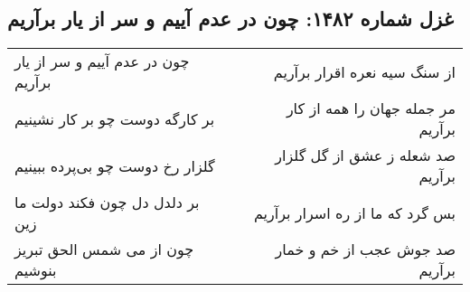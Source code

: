 \begin{center}
\section*{غزل شماره ۱۴۸۲: چون در عدم آییم و سر از یار برآریم}
\label{sec:1482}
\begin{longtable}{l p{0.5cm} r}
چون در عدم آییم و سر از یار برآریم
&&
از سنگ سیه نعره اقرار برآریم
\\
بر کارگه دوست چو بر کار نشینیم
&&
مر جمله جهان را همه از کار برآریم
\\
گلزار رخ دوست چو بی‌پرده ببینیم
&&
صد شعله ز عشق از گل گلزار برآریم
\\
بر دلدل دل چون فکند دولت ما زین
&&
بس گرد که ما از ره اسرار برآریم
\\
چون از می شمس الحق تبریز بنوشیم
&&
صد جوش عجب از خم و خمار برآریم
\\
\end{longtable}
\end{center}
